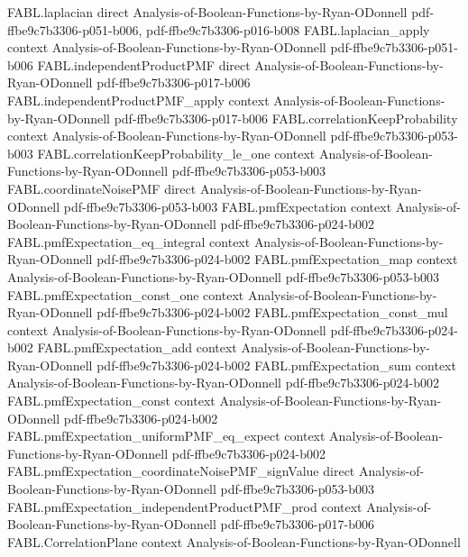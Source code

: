 \begin{theorem}
  {FABL.laplacian}
  {direct}
  {Analysis-of-Boolean-Functions-by-Ryan-ODonnell}
  {pdf-ffbe9c7b3306-p051-b006,
    pdf-ffbe9c7b3306-p016-b008}
\proofstep
  {FABL.laplacian_apply}
  {context}
  {Analysis-of-Boolean-Functions-by-Ryan-ODonnell}
  {pdf-ffbe9c7b3306-p051-b006}
\proofstep
  {FABL.independentProductPMF}
  {direct}
  {Analysis-of-Boolean-Functions-by-Ryan-ODonnell}
  {pdf-ffbe9c7b3306-p017-b006}
\proofstep
  {FABL.independentProductPMF_apply}
  {context}
  {Analysis-of-Boolean-Functions-by-Ryan-ODonnell}
  {pdf-ffbe9c7b3306-p017-b006}
\proofstep
  {FABL.correlationKeepProbability}
  {context}
  {Analysis-of-Boolean-Functions-by-Ryan-ODonnell}
  {pdf-ffbe9c7b3306-p053-b003}
\proofstep
  {FABL.correlationKeepProbability_le_one}
  {context}
  {Analysis-of-Boolean-Functions-by-Ryan-ODonnell}
  {pdf-ffbe9c7b3306-p053-b003}
\proofstep
  {FABL.coordinateNoisePMF}
  {direct}
  {Analysis-of-Boolean-Functions-by-Ryan-ODonnell}
  {pdf-ffbe9c7b3306-p053-b003}
\proofstep
  {FABL.pmfExpectation}
  {context}
  {Analysis-of-Boolean-Functions-by-Ryan-ODonnell}
  {pdf-ffbe9c7b3306-p024-b002}
\proofstep
  {FABL.pmfExpectation_eq_integral}
  {context}
  {Analysis-of-Boolean-Functions-by-Ryan-ODonnell}
  {pdf-ffbe9c7b3306-p024-b002}
\proofstep
  {FABL.pmfExpectation_map}
  {context}
  {Analysis-of-Boolean-Functions-by-Ryan-ODonnell}
  {pdf-ffbe9c7b3306-p053-b003}
\proofstep
  {FABL.pmfExpectation_const_one}
  {context}
  {Analysis-of-Boolean-Functions-by-Ryan-ODonnell}
  {pdf-ffbe9c7b3306-p024-b002}
\proofstep
  {FABL.pmfExpectation_const_mul}
  {context}
  {Analysis-of-Boolean-Functions-by-Ryan-ODonnell}
  {pdf-ffbe9c7b3306-p024-b002}
\proofstep
  {FABL.pmfExpectation_add}
  {context}
  {Analysis-of-Boolean-Functions-by-Ryan-ODonnell}
  {pdf-ffbe9c7b3306-p024-b002}
\proofstep
  {FABL.pmfExpectation_sum}
  {context}
  {Analysis-of-Boolean-Functions-by-Ryan-ODonnell}
  {pdf-ffbe9c7b3306-p024-b002}
\proofstep
  {FABL.pmfExpectation_const}
  {context}
  {Analysis-of-Boolean-Functions-by-Ryan-ODonnell}
  {pdf-ffbe9c7b3306-p024-b002}
\proofstep
  {FABL.pmfExpectation_uniformPMF_eq_expect}
  {context}
  {Analysis-of-Boolean-Functions-by-Ryan-ODonnell}
  {pdf-ffbe9c7b3306-p024-b002}
\proofstep
  {FABL.pmfExpectation_coordinateNoisePMF_signValue}
  {direct}
  {Analysis-of-Boolean-Functions-by-Ryan-ODonnell}
  {pdf-ffbe9c7b3306-p053-b003}
\proofstep
  {FABL.pmfExpectation_independentProductPMF_prod}
  {context}
  {Analysis-of-Boolean-Functions-by-Ryan-ODonnell}
  {pdf-ffbe9c7b3306-p017-b006}
\proofstep
  {FABL.CorrelationPlane}
  {context}
  {Analysis-of-Boolean-Functions-by-Ryan-ODonnell}

\end{theorem}
